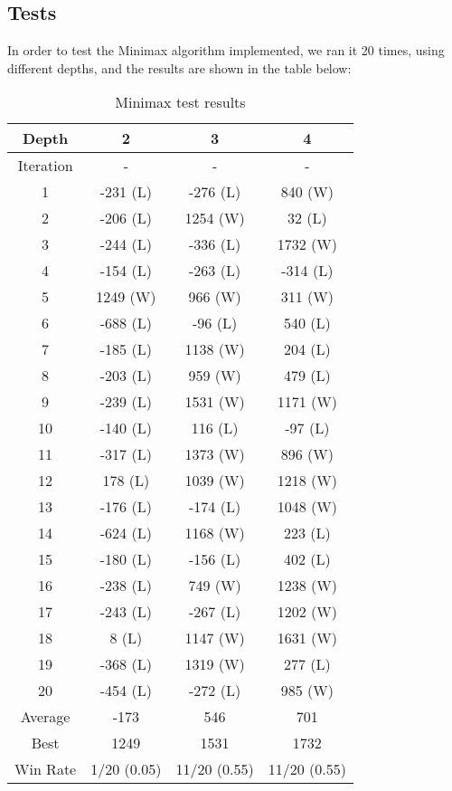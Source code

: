 \documentclass{article}
\begin{document}
\subsection{Tests}

In order to test the Minimax algorithm implemented, we ran it 20 times, using different depths, and the results are shown in the table below: \\

\begin{table}[ht]
  \begin{center}
  \begin{tabular}{||c||c|c|c||}
    \hline
    Depth & 2 & 3 & 4 \\
    \hline\hline
    Iteration & - & - & - \\
    \hline
    1 & -231 (L) & -276 (L) &  840 (W) \\
    \hline
    2 & -206 (L) & 1254 (W) &   32 (L) \\
    \hline
    3 & -244 (L) & -336 (L) & 1732 (W) \\
    \hline
    4 & -154 (L) & -263 (L) & -314 (L) \\
    \hline
    5 & 1249 (W) &  966 (W) &  311 (W) \\
    \hline
    6 & -688 (L) &  -96 (L) &  540 (L) \\
    \hline
    7 & -185 (L) & 1138 (W) &  204 (L) \\
    \hline
    8 & -203 (L) &  959 (W) &  479 (L) \\
    \hline
    9 & -239 (L) & 1531 (W) & 1171 (W) \\
    \hline
    10 & -140 (L) &  116 (L) &  -97 (L) \\
    \hline
    11 & -317 (L) & 1373 (W) &  896 (W) \\
    \hline
    12 &  178 (L) & 1039 (W) & 1218 (W) \\
    \hline
    13 & -176 (L) & -174 (L) & 1048 (W) \\
    \hline
    14 & -624 (L) & 1168 (W) &  223 (L) \\
    \hline
    15 & -180 (L) & -156 (L) &  402 (L) \\
    \hline
    16 & -238 (L) &  749 (W) & 1238 (W) \\
    \hline
    17 & -243 (L) & -267 (L) & 1202 (W) \\
    \hline
    18 &    8 (L) & 1147 (W) & 1631 (W) \\
    \hline
    19 & -368 (L) & 1319 (W) &  277 (L) \\
    \hline
    20 & -454 (L) & -272 (L) &  985 (W) \\
    \hline\hline
    Average &  -173 &  546 &  701 \\
    \hline\hline
    Best & 1249 & 1531 & 1732 \\
    \hline\hline
    Win Rate & 1/20 (0.05) & 11/20 (0.55) & 11/20 (0.55) \\
    \hline
  \end{tabular}
  \caption{Minimax test results}
  \end{center}
\end{table}
\end{document}

